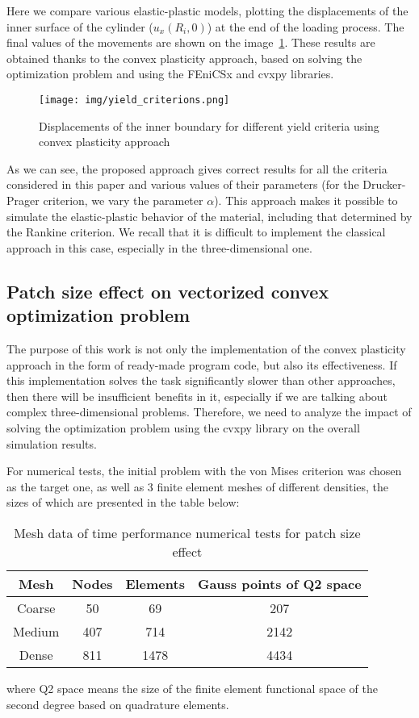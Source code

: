 \documentclass[12pt]{article}
\begin{document}
Here we compare various elastic-plastic models, plotting the displacements of the inner surface of the cylinder ($u_x(R_i, 0)$) at the end of the loading process. The final values of the movements are shown on the image~\ref{fig:yield_criteria}. These results are obtained thanks to the convex plasticity approach, based on solving the optimization problem and using the FEniCSx and cvxpy libraries.
\begin{figure}[H]
    \center
    \texttt{[image: img/yield\_criterions.png]}
    \caption{Displacements of the inner boundary for different yield criteria using convex plasticity approach}
    \label{fig:yield_criteria}
\end{figure}
As we can see, the proposed approach gives correct results for all the criteria considered in this paper and various values of their parameters (for the Drucker-Prager criterion, we vary the parameter $\alpha$). This approach makes it possible to simulate the elastic-plastic behavior of the material, including that determined by the Rankine criterion. We recall that it is difficult to implement the classical approach in this case, especially in the three-dimensional one.

\subsection{Patch size effect on vectorized convex optimization problem}
The purpose of this work is not only the implementation of the convex plasticity approach in the form of ready-made program code, but also its effectiveness. If this implementation solves the task significantly slower than other approaches, then there will be insufficient benefits in it, especially if we are talking about complex three-dimensional problems. Therefore, we need to analyze the impact of solving the optimization problem using the cvxpy library on the overall simulation results. 

For numerical tests, the initial problem with the von Mises criterion was chosen as the target one, as well as 3 finite element meshes of different densities, the sizes of which are presented in the table below:

\begin{table}[H]
	\centering
	\begin{tabular}{|cccc|}
		\hline
		Mesh & Nodes & Elements & Gauss points of Q2 space \\
		\hline
		Coarse & 50	& 69 & 207 \\
		Medium & 407 & 714 & 2142 \\
		Dense & 811	& 1478 & 4434 \\
		\hline
	\end{tabular}
	\caption{Mesh data of time performance numerical tests for patch size effect}
    \label{tab:cvxpy_tests}
\end{table}
where Q2 space means the size of the finite element functional space of the second degree based on quadrature elements.
\end{document}
